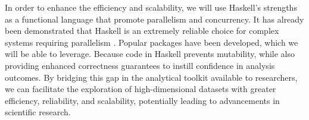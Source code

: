 \documentclass[11pt,letterpaper]{article}
\begin{document}


In order to enhance the efficiency and scalability, we will use Haskell's strengths as a functional language that promote parallelism and concurrency. 
It has already been demonstrated that Haskell is an extremely reliable choice for complex systems requiring parallelism \parencite{fbFightingSpam}.
Popular packages have been developed, which we will be able to leverage. %
Because code in Haskell prevents mutability, while also providing enhanced correctness guarantees to instill confidence in analysis outcomes. By bridging this gap in the analytical toolkit available to researchers, we can facilitate the exploration of high-dimensional datasets with greater efficiency, reliability, and scalability, potentially leading to advancements in scientific research. 

\end{document}
